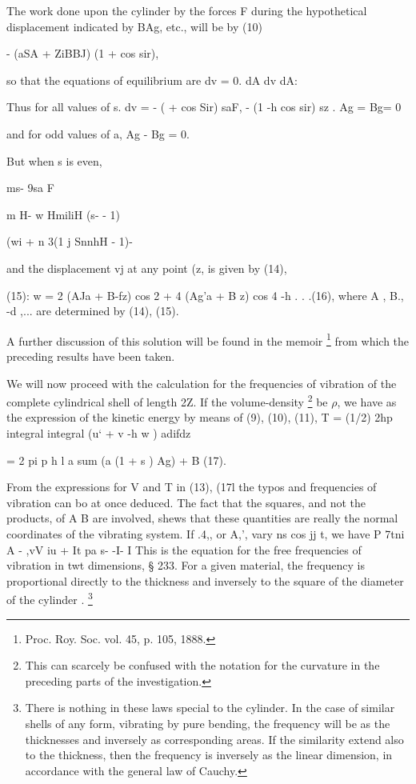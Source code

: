 The work done upon the cylinder by the forces F during the hypothetical
displacement indicated by BAg, etc., will be by (10)

- (aSA  + ZiBBJ) (1 + cos sir),

so that the equations of equilibrium are dv = 0.  dA dv dA:

Thus for all values of s.  dv = - ( + cos Sir) saF,  - (1 -h cos sir) sz .
Ag = Bg= 0

and for odd values of a, Ag - Bg = 0.

But when s is even,

ms- 9sa F

m H- w  HmiliH (s- - 1)

(wi + n 3(1 j  SnnhH - 1)-

and the displacement vj at any point (z, is given by (14),

(15): w = 2 (AJa + B-fz) cos 2 + 4 (Ag'a + B z) cos 4 -h . . .(16), where A ,
B., -d ,... are determined by (14), (15).

A further discussion of this solution will be found in the memoir
\footnote{Proc. Roy. Soc. vol. 45, p. 105, 1888.} from which
the preceding results have been taken.

We will now proceed with the calculation for the frequencies of vibration of
the complete cylindrical shell of length 2Z. If the volume-density
\footnote{This can scarcely be confused with the notation for the curvature in
the preceding parts of the investigation.}
be \(\rho \), we
have as the expression of the kinetic energy by means of (9), (10), (11),
T = (1/2) 2hp integral integral (u‘ + v -h w ) adifdz

= 2 pi p h l a  sum (a (1 + s ) Ag)  + B  (17).

From the expressions for V and T in
(13), (17l the typos and frequencies of vibration can bo at once deduced. The
fact that the squares, and not the products, of A B are involved, shews that
these quantities are really the normal coordinates of the vibrating system. If
.4,, or A,', vary ns cos jj t, we have P 7tni A  - ,vV iu + It pa s- -I- I
This is the equation for the free frequencies of vibration in twt dimensions, § 233.
For a given material, the frequency is proportional directly to the
thickness and inversely to the square of the diameter of the cylinder .
\footnote{There is nothing in these laws special to the cylinder. In the case
of similar shells of any form, vibrating by pure bending, the frequency will be as the
thicknesses and inversely as corresponding areas. If the similarity extend also
to the thickness, then the frequency is inversely as the linear dimension, in
accordance with the general law of Cauchy.}

